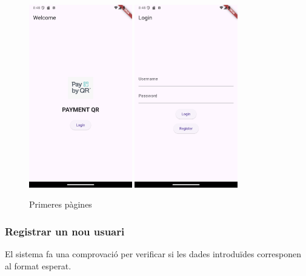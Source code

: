 \documentclass[a4paper,12pt,twoside]{ThesisStyle}
\begin{document}
\begin{figure}[h]
    \centering
    \includegraphics[width=0.4\textwidth]{imatges/welcomepage.png}
    \includegraphics[width=0.4\textwidth]{imatges/login.png}
    \caption{Primeres pàgines}
    \label{fig: Primeres pàgines}
\end{figure}

\clearpage
\subsubsection{Registrar un nou usuari}
\label{subsubsec: Registrar un nou usuari}

El sistema fa una comprovació per verificar si les dades introduïdes corresponen al format esperat.\\
\end{document}

